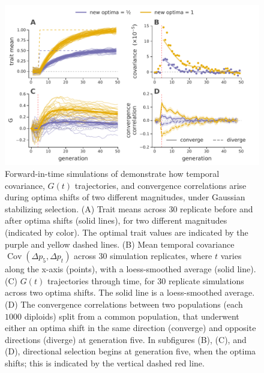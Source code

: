 \documentclass[11pt]{article}
\DeclareMathOperator{\cov}{Cov}
\begin{document}
\begin{figure}[!htb]
  \centering
  \includegraphics[width=\textwidth]{figures/figure-4-edited.pdf}

  \caption{Forward-in-time simulations of demonstrate how temporal covariance,
    $G(t)$ trajectories, and convergence correlations arise during optima
    shifts of two different magnitudes, under Gaussian stabilizing selection.
    (A) Trait means across 30 replicate before and after optima shifts (solid
    lines), for two different magnitudes (indicated by color). The optimal
    trait values are indicated by the purple and yellow dashed lines.  (B) Mean
    temporal covariance $\cov(\Delta p_5, \Delta p_t)$ across 30 simulation
    replicates, where $t$ varies along the x-axis (points), with a
    loess-smoothed average (solid line). (C) $G(t)$ trajectories through time,
    for 30 replicate simulations across two optima shifts. The solid line is a
    loess-smoothed average. (D) The convergence correlations between two
    populations (each $1000$ diploids) split from a common population, that
    underwent either an optima shift in the same direction (converge) and
    opposite directions (diverge) at generation five. In subfigures (B), (C),
    and (D), directional selection begins at generation five, when the optima
    shifts; this is indicated by the vertical dashed red line.}

  \label{fig:figure-4}
\end{figure}
\end{document}
